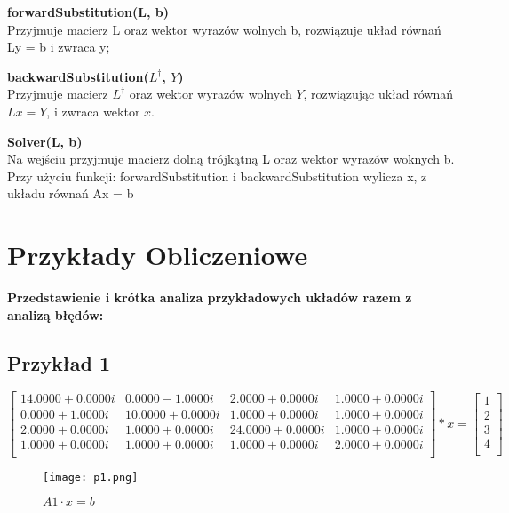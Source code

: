 \documentclass{article}
\begin{document}
\vspace{6pt}
\textbf{\large forwardSubstitution(L, b)} \\
Przyjmuje macierz L oraz wektor wyrazów wolnych b, 
rozwiązuje układ równań Ly = b i zwraca y;

\vspace{6pt}
\textbf{\large backwardSubstitution($L^\dagger$, $Y$)} \\
Przyjmuje macierz $L^\dagger$ oraz wektor wyrazów wolnych $Y$, rozwiązując układ równań $Lx = Y$, i zwraca wektor $x$.

\vspace{6pt}
\textbf{\large Solver(L, b)} \\
Na wejściu przyjmuje macierz dolną trójkątną L oraz wektor wyrazów woknych b. Przy użyciu funkcji: forwardSubstitution i backwardSubstitution wylicza x, z układu równań Ax = b


\vspace{12pt} 

\section{Przykłady Obliczeniowe}
\vspace{12pt}
\textbf{\large Przedstawienie i krótka analiza przykładowych układów razem z analizą błędów:} \\
\subsection*{Przykład 1}
\vspace{12pt}
\[\begin{bmatrix}
14.0000 + 0.0000i & 0.0000 - 1.0000i & 2.0000 + 0.0000i & 1.0000 + 0.0000i \\
0.0000 + 1.0000i & 10.0000 + 0.0000i & 1.0000 + 0.0000i & 1.0000 + 0.0000i \\
2.0000 + 0.0000i & 1.0000 + 0.0000i & 24.0000 + 0.0000i & 1.0000 + 0.0000i \\
1.0000 + 0.0000i & 1.0000 + 0.0000i & 1.0000 + 0.0000i & 2.0000 + 0.0000i \\
\end{bmatrix} * x = 
\begin{bmatrix} 1 \\ 2 \\ 3 \\ 4 \\
\end{bmatrix}
 \]

\begin{figure}[hbt!]
  \centering
    \texttt{[image: p1.png]}
    \caption{$A1 \cdot x = b$}
    \label{fig:example}
\end{figure}
\end{document}
